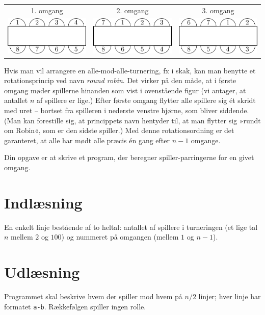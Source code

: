 
\begin{tabular}{ccc}
  1. omgang & 2. omgang & 3. omgang\\[1ex]
  \includegraphics{img/turnering-img-1.pdf} &
  \includegraphics{img/turnering-img-2.pdf} &
  \includegraphics{img/turnering-img-3.pdf} 
\end{tabular}
\bigskip

Hvis man vil arrangere en alle-mod-alle-turnering, fx i skak, kan man benytte et rotationsprincip ved navn \emph{round robin}.
Det virker på den måde, at i første omgang møder spillerne hinanden som vist i ovenstående figur (vi antager, at antallet $n$ af spillere er lige.)
Efter første omgang flytter alle spillere sig ét skridt med uret -- bortset fra spilleren i nederste venstre hjørne, som bliver siddende.
(Man kan forestille sig, at princippets navn hentyder til, at man flytter sig »rundt om Robin«, som er den sidste spiller.) 
Med denne rotationsordning er det garanteret, at alle har mødt alle præcis én gang efter $n-1$ omgange.

Din opgave er at skrive et program, der beregner spiller-parringerne for en givet omgang.

\section*{Indlæsning}
En enkelt linje bestående af to heltal: antallet af spillere i turneringen (et lige tal $n$ mellem $2$ og $100$) og nummeret på omgangen (mellem $1$ og $n-1$).

\section*{Udlæsning}

Programmet skal beskrive hvem der spiller mod hvem på $n/2$ linjer; hver linje har formatet \texttt{a-b}.
Rækkefølgen spiller ingen rolle.
